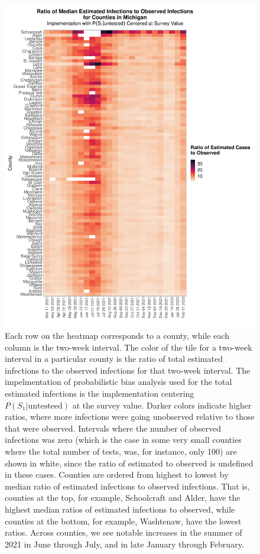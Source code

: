 \documentclass[12pt,twoside]{smiththesis}
\begin{document}
\begin{figure}
\includegraphics[width=1\linewidth]{figure/mi_county_heatmap_ratio_est_observed} \caption{\label{fig:mi-county-heatmap}Each row on the heatmap corresponds to a county, while each column is the two-week interval. The color of the tile for a two-week interval in a particular county is the ratio of total estimated infections to the observed infections for that two-week interval. The impelmentation of probabilistic bias analysis used for the total estimated infections is the implementation centering $P(S_1|\text{untesteed})$ at the survey value. Darker colors indicate higher ratios, where more infections were going unobserved relative to those that were observed. Intervals where the number of observed infections was zero (which is the case in some very small counties where the total number of tests, was, for instance, only 100) are shown in white, since the ratio of estimated to observed is undefined in these cases. Counties are ordered from highest to lowest by median ratio of estimated infections to observed infections. That is, counties at the top, for example, Schoolcraft and Alder, have the highest median ratios of estimated infections to observed, while counties at the bottom, for example, Washtenaw, have the lowest ratios. Across counties, we see notable increases in the summer of 2021 in June through July, and in late January through February.}\label{fig:unnamed-chunk-97}
\end{figure}
\end{document}
